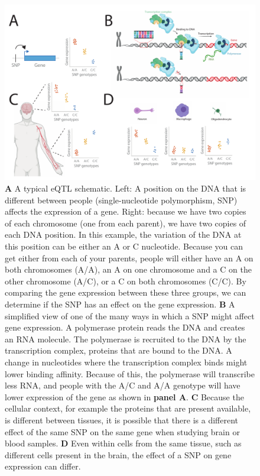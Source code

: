 \begin{figure}[H]
	\includegraphics[width=\textwidth]{chapters/chapter1-introduction/img/2021-03-07-fig1.pdf}
	\caption{\textbf{A} A typical eQTL schematic. Left:  A position on the DNA that is different between people (single-nucleotide polymorphism, SNP)  affects the expression of a gene. Right: because we have two copies of each chromosome (one from each parent), we have two copies of each DNA position. In this example, the variation of the DNA at this position can be either an A or C nucleotide. Because you can get either from each of your parents, people will either have an A on both chromosomes (A/A), an A on one chromosome and a C on the other chromosome (A/C), or a C on both chromosomes (C/C). By comparing the gene expression between these three groups, we can determine if the SNP has an effect on the gene expression. \textbf{B} A simplified view of one of the many ways in which a  SNP might affect gene expression. A polymerase protein reads the DNA and creates an RNA molecule. The polymerase is recruited to the DNA by the transcription complex, proteins that are bound to the DNA. A change in nucleotides where the transcription complex binds might lower binding affinity. Because of this, the polymerase will transcribe less RNA, and people with the A/C and A/A genotype will have lower expression of the gene as shown in \textbf{panel A}. \textbf{C} Because the cellular context, for example the proteins that are present available, is different between tissues, it is possible that there is a different effect of the same SNP on the same gene when studying brain or blood samples. \textbf{D} Even within cells from the same tissue, such as different cells present in the brain, the effect of a SNP on gene expression can differ.}
	\label{introduction_fig1}
\end{figure}


